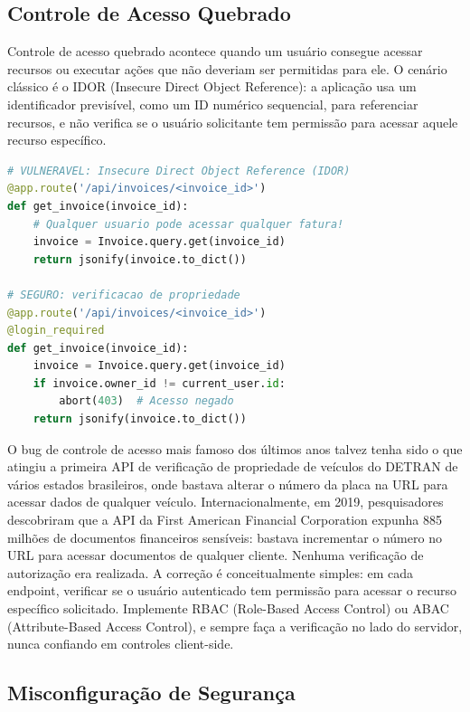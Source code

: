 \subsection{Controle de Acesso Quebrado}

Controle de acesso quebrado acontece quando um usuário consegue acessar recursos
ou executar ações que não deveriam ser permitidas para ele. O cenário clássico é
o IDOR (Insecure Direct Object Reference): a aplicação usa um identificador
previsível, como um ID numérico sequencial, para referenciar recursos, e
não verifica se o usuário solicitante tem permissão para acessar aquele recurso
específico.

\begin{lstlisting}[language=Python, caption={Controle de acesso -- IDOR vulnerável}]
# VULNERAVEL: Insecure Direct Object Reference (IDOR)
@app.route('/api/invoices/<invoice_id>')
def get_invoice(invoice_id):
    # Qualquer usuario pode acessar qualquer fatura!
    invoice = Invoice.query.get(invoice_id)
    return jsonify(invoice.to_dict())

# SEGURO: verificacao de propriedade
@app.route('/api/invoices/<invoice_id>')
@login_required
def get_invoice(invoice_id):
    invoice = Invoice.query.get(invoice_id)
    if invoice.owner_id != current_user.id:
        abort(403)  # Acesso negado
    return jsonify(invoice.to_dict())
\end{lstlisting}

O bug de controle de acesso mais famoso dos últimos anos talvez tenha sido o que
atingiu a primeira API de verificação de propriedade de veículos do DETRAN de
vários estados brasileiros, onde bastava alterar o número da placa na URL para
acessar dados de qualquer veículo. Internacionalmente, em 2019, pesquisadores
descobriram que a API da First American Financial Corporation expunha 885 milhões
de documentos financeiros sensíveis: bastava incrementar o número no URL para
acessar documentos de qualquer cliente. Nenhuma verificação de autorização era
realizada. A correção é conceitualmente simples: em cada endpoint, verificar se
o usuário autenticado tem permissão para acessar o recurso específico solicitado.
Implemente RBAC (Role-Based Access Control) ou ABAC (Attribute-Based Access
Control), e sempre faça a verificação no lado do servidor, nunca confiando em
controles client-side.

\subsection{Misconfiguração de Segurança}

